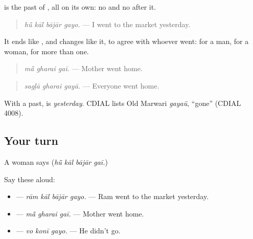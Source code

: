 \begin{grammarlens}[title={Grammar Lens: one word for the past}]
\textbf{} is the past of \textbf{}, all on its own: no \textbf{} and no \textbf{} after it.

\begin{quote}
\textbf{   }
\end{quote}

\begin{quote}
\emph{hū̃ kāl bājār gayo.} — I went to the market yesterday.
\end{quote}

It ends like \textbf{}, and changes like it, to agree with whoever went: \textbf{} for a man, \textbf{} for a woman, \textbf{} for more than one.

\begin{quote}
\textbf{  }
\end{quote}

\begin{quote}
\emph{mā̃ gharai gaī.} — Mother went home.
\end{quote}

\begin{quote}
\textbf{  }
\end{quote}

\begin{quote}
\emph{sagḷā gharai gayā.} — Everyone went home.
\end{quote}

With a past, \textbf{} is \emph{yesterday}. CDIAL lists Old Marwari \emph{gayaü}, \textquotedblleft{}gone\textquotedblright{} (CDIAL 4008).
\end{grammarlens}

\subsection*{Your turn}
A woman says \textbf{   } (\emph{hū̃ kāl bājār gaī.})

Say these aloud:

\begin{itemize}
\raggedright
  \item \textbf{   } — \emph{rām kāl bājār gayo.} — Ram went to the market yesterday.
  \item \textbf{  } — \emph{mā̃ gharai gaī.} — Mother went home.
  \item \textbf{  } — \emph{vo konī gayo.} — He didn't go.
\end{itemize}

